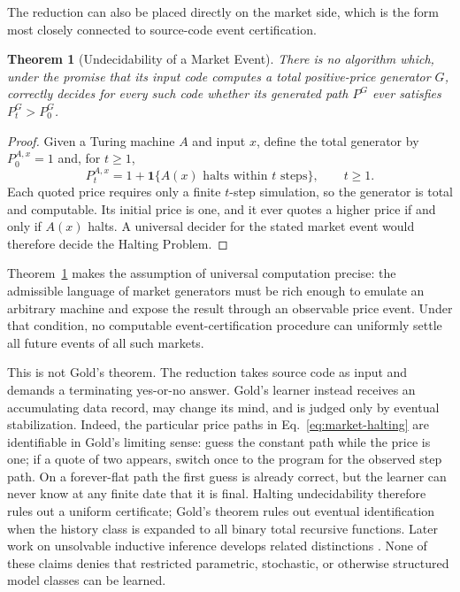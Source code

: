\documentclass[aps,pra,reprint,superscriptaddress,amsmath,amssymb,floatfix]{revtex4-2}
\theoremstyle{plain}
\newtheorem{theorem}{Theorem}
\theoremstyle{definition}
\theoremstyle{remark}
\begin{document}
The reduction can also be placed directly on the market side, which is the
form most closely connected to source-code event certification.

\begin{theorem}[Undecidability of a Market Event]
  \label{thm:market-undecidable}
  There is no algorithm which, under the promise that its input code computes
  a total positive-price generator \(G\), correctly decides for every such
  code whether its generated path \(P^G\) ever satisfies \(P_t^G>P_0^G\).
\end{theorem}

\begin{proof}
Given a Turing machine \(A\) and input \(x\), define the total generator by
\(P_0^{A,x}=1\) and, for \(t\geq1\),
\begin{equation}
  P_t^{A,x}
  =1+\mathbf{1}\{A(x)\text{ halts within }t\text{ steps}\},
  \qquad t\geq1 .
  \label{eq:market-halting}
\end{equation}
Each quoted price requires only a finite \(t\)-step simulation, so the
generator is total and computable. Its initial price is one, and it ever quotes
a higher price if and only if \(A(x)\) halts. A universal decider for the stated
market event would therefore decide the Halting Problem.
\end{proof}

Theorem~\ref{thm:market-undecidable} makes the assumption of universal
computation precise: the admissible language of market generators must be rich
enough to emulate an arbitrary machine and expose the result through an
observable price event. Under that condition, no computable event-certification
procedure can uniformly settle all future events of all such markets.

This is not Gold's theorem. The reduction takes source code as input and
demands a terminating yes-or-no answer. Gold's learner instead receives an
accumulating data record, may change its mind, and is judged only by eventual
stabilization. Indeed, the particular price paths in
Eq.~\eqref{eq:market-halting} are identifiable in Gold's limiting sense: guess
the constant path while the price is one; if a quote of two appears, switch
once to the program for the observed step path. On a forever-flat path the
first guess is already correct, but the learner can never know at any finite
date that it is final. Halting undecidability therefore rules out a uniform
certificate; Gold's theorem rules out eventual identification when the
history class is expanded to all binary total recursive functions. Later work
on unsolvable inductive inference develops related distinctions
\cite{blum75blum,angluin:83,ad-91,2016-AlexanderKarlSvozil-ml,moore}.
None of these claims denies that restricted parametric, stochastic, or
otherwise structured model classes can be learned.
\end{document}
